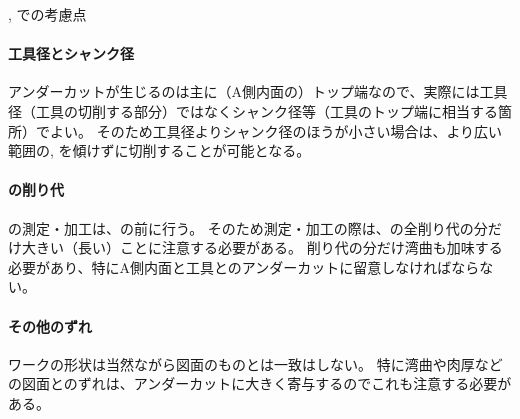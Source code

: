 \begin{\Columnname}{\BfaceDimpleMilling, \DfaceDimpleMilling での考慮点}
\paragraph*{工具径とシャンク径}
アンダーカットが生じるのは主に（A側内面の）トップ端なので、実際には工具径（工具の切削する部分）ではなくシャンク径等（工具のトップ端に相当する箇所）でよい。
そのため工具径よりシャンク径のほうが小さい場合は、より広い範囲の\BfaceDimpleMilling, \DfaceDimpleMilling を傾けずに切削することが可能となる。
\tcbline*
\paragraph*{\nameEndFacecut の削り代}
\Dimple の測定・加工は、\TopEndFacecutMilling の前に行う。
そのため測定・加工の際は、\nameEndFacecut の全削り代の分だけ大きい（長い）ことに注意する必要がある。
削り代の分だけ湾曲も加味する必要があり、特にA側内面と工具とのアンダーカットに留意しなければならない。
\tcbline*
\paragraph*{その他のずれ}
ワークの形状は当然ながら図面のものとは一致はしない。
特に湾曲や肉厚などの図面とのずれは、アンダーカットに大きく寄与するのでこれも注意する必要がある。
\end{\Columnname}



